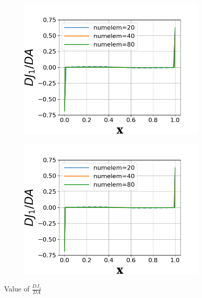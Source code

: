 \documentclass[a4paper]{article}
\begin{document}
\begin{figure}[!htbp]
\begin{subfigure}{0.45\textwidth}
    \includegraphics[width=1.0\linewidth]{figures/DJ1DA_p3.png}
    \label{fig:Dj1_p3}
  \end{subfigure}
  \begin{subfigure}{0.45\textwidth}
    \centering
    \includegraphics[width=1.0\linewidth]{figures/DJ1DA_p4.png}
    \label{fig:Dj1_p4}
  \end{subfigure}
  \caption{Value of $\frac{DJ_1}{DA}$} 
  \label{fig:dJ1dA}
\end{figure}
\end{document}
